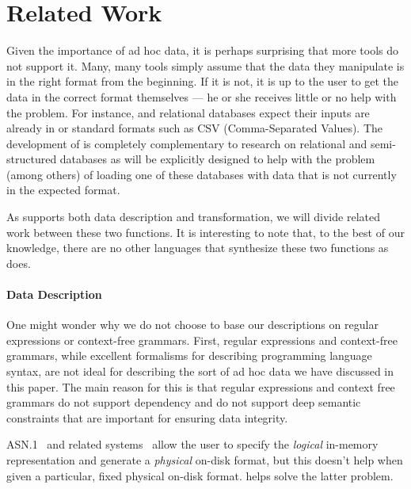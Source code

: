 \section{Related Work}
\label{sec:related-work}

Given the importance of ad hoc data, it is perhaps surprising that
more tools do not support it.  Many, many tools simply assume that the
data they manipulate is in the right format from the beginning.  If it
is not, it is up to the user to get the data in the correct format
themselves --- he or she receives little or no help with the problem.
For instance, \xml{} and relational databases expect their inputs are
already in \xml{} or standard formats such as CSV (Comma-Separated
Values).  The development of \datatype{} is completely complementary
to research on relational and semi-structured databases as \datatype
will be explicitly designed to help with the problem (among others) of
loading one of these databases with data that is not currently in the
expected format.

As \datatype{} supports both data description and transformation, we
will divide related work between these two functions. It is
interesting to note that, to the best of our knowledge, there are no
other languages that synthesize these two functions as \datatype{}
does.


\paragraph{Data Description}

One might wonder why we do not choose to base our descriptions on
regular expressions or context-free grammars. First, regular
expressions and context-free grammars, while excellent formalisms for
describing programming language syntax, are not ideal for describing
the sort of ad hoc data we have discussed in this paper.  The main
reason for this is that regular expressions and context free grammars
do not support dependency and do not support deep semantic constraints
that are important for ensuring data integrity.

ASN.1~\cite{asn} and related systems~\cite{asdl} allow the user to
specify the {\em logical} in-memory representation and generate a {\em
  physical} on-disk format, but this doesn't help when given a
particular, fixed physical on-disk format.  \datatype{} helps solve
the latter problem.

